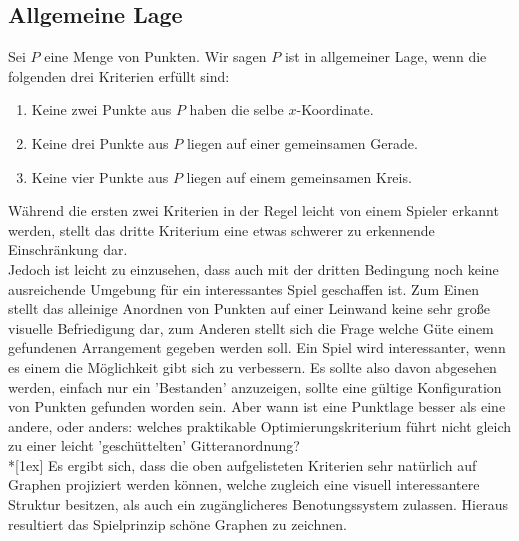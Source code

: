 \documentclass[a4paper,twocolumn]{scrartcl}
\begin{document}
\subsection{Allgemeine Lage}
\label{sec:Allgemeine_Lage}
Sei $P$ eine Menge von Punkten. Wir sagen $P$ ist in allgemeiner Lage, wenn die folgenden drei Kriterien erf\"ullt
sind:
\begin{enumerate}
  \item
    Keine zwei Punkte aus $P$ haben die selbe $x$-Koordinate.
  \item
    Keine drei Punkte aus $P$ liegen auf einer gemeinsamen Gerade.
  \item
    Keine vier Punkte aus $P$ liegen auf einem gemeinsamen Kreis.
\end{enumerate}
W\"ahrend die ersten zwei Kriterien in der Regel leicht von einem Spieler erkannt werden, stellt das dritte Kriterium
eine etwas schwerer zu erkennende Einschr\"ankung dar.\\
Jedoch ist leicht zu einzusehen, dass auch mit der dritten
Bedingung noch keine ausreichende Umgebung f\"ur ein interessantes Spiel geschaffen ist. Zum Einen stellt das alleinige
Anordnen von Punkten auf einer Leinwand keine sehr gro\ss e visuelle Befriedigung dar, zum Anderen stellt sich die Frage
welche G\"ute einem gefundenen Arrangement gegeben werden soll. Ein Spiel wird interessanter, wenn es einem die
M\"oglichkeit gibt sich zu verbessern. Es sollte also davon abgesehen werden, einfach nur ein 'Bestanden' anzuzeigen,
sollte eine g\"ultige Konfiguration von Punkten gefunden worden sein. Aber wann ist eine Punktlage besser als eine
andere, oder anders: welches praktikable Optimierungskriterium f\"uhrt nicht gleich zu einer leicht 'gesch\"uttelten' 
Gitteranordnung?\\*[1ex]
Es ergibt sich, dass  die oben aufgelisteten Kriterien sehr nat\"urlich auf Graphen projiziert werden k\"onnen, welche
zugleich eine visuell interessantere Struktur besitzen, als auch ein zug\"anglicheres Benotungssystem zulassen. Hieraus
resultiert das Spielprinzip sch\"one Graphen zu zeichnen.
\end{document}
